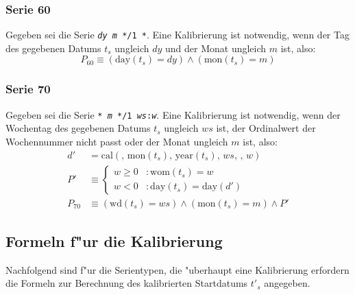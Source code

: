 \documentclass[a4paper]{article}
\newcommand*{\dayf}{\mathrm{day}}
\newcommand*{\monf}{\mathrm{mon}}
\newcommand*{\yearf}{\mathrm{year}}
\newcommand*{\wdf}{\mathrm{wd}}
\newcommand*{\womf}{\mathrm{wom}}
\newcommand*{\calf}{\mathrm{cal}}
\numberwithin{equation}{section}
\begin{document}
\subsubsection{Serie 60}
Gegeben sei die Serie \texttt{\textit{dy} \textit{m} */1 *}. Eine Kalibrierung
ist notwendig, wenn der Tag des gegebenen Datums $t_s$ ungleich $dy$ und der
Monat ungleich $m$ ist, also:
\begin{equation}
  P_{60} \equiv (\dayf(t_s) = dy) \wedge (\monf(t_s) = m)
\end{equation}

\subsubsection{Serie 70}
Gegeben sei die Serie \texttt{* \textit{m} */1 \textit{ws}:\textit{w}}. Eine
Kalibrierung ist notwendig, wenn der Wochentag des gegebenen Datums $t_s$
ungleich $ws$ ist, der Ordinalwert der Wochennummer nicht passt oder der Monat
ungleich $m$ ist, also:
\begin{equation}
\begin{split}
  d' & = \calf(,\,\monf(t_s),\,\yearf(t_s),\,ws,\,,\,w) \\
  P' & \equiv \left\{\begin{array}{ll}
      w \ge 0 & : \womf(t_s) = w \\
      w < 0 & : \dayf(t_s) = \dayf(d')
    \end{array}\right. \\
  P_{70} & \equiv (\wdf(t_s) = ws) \wedge (\monf(t_s) = m) \wedge P'
\end{split}
\end{equation}


%
%
\subsection{Formeln f"ur die Kalibrierung}
Nachfolgend sind f"ur die Serientypen, die "uberhaupt eine Kalibrierung
erfordern die Formeln zur Berechnung des kalibrierten Startdatums $t'_s$
angegeben.
\end{document}

